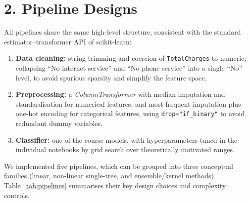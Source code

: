 \documentclass[11pt,a4paper]{article}
\begin{document}
\section*{2. Pipeline Designs}

All pipelines share the same high-level structure, consistent with the standard estimator–transformer API of scikit-learn:

\begin{enumerate}[label=(\roman*)]
    \item \textbf{Data cleaning:} string trimming and coercion of \texttt{TotalCharges} to numeric; collapsing ``No internet service'' and ``No phone service'' into a single ``No'' level, to avoid spurious sparsity and simplify the feature space.
    \item \textbf{Preprocessing:} a \emph{ColumnTransformer} with median imputation and standardisation for numerical features, and most-frequent imputation plus one-hot encoding for categorical features, using \texttt{drop="if\_binary"} to avoid redundant dummy variables.
    \item \textbf{Classifier:} one of the course models, with hyperparameters tuned in the individual notebooks by grid search over theoretically motivated ranges.
\end{enumerate}

\vspace{0.5em}
\noindent
We implemented five pipelines, which can be grouped into three conceptual families (linear, non-linear single-tree, and ensemble/kernel methods). Table~\ref{tab:pipelines} summarises their key design choices and complexity controls.
\end{document}
